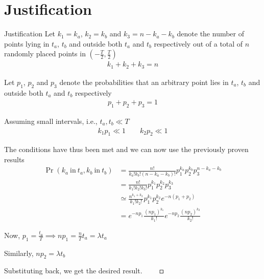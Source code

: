 \documentclass{beamer}
\providecommand{\pr}[1]{\ensuremath{\Pr\left(#1\right)}}
\providecommand{\brak}[1]{\ensuremath{\left(#1\right)}}
\begin{document}
	\section{Justification}
	\begin{frame}{Justification}
	Let $k_1 = k_a$, $k_2 = k_b$ and $k_3 = n - k_a - k_b$ denote the number of points lying in $t_a$, $t_b$ and outside both $t_a$ and $t_b$ respectively out of a total of $n$ randomly placed points in $\brak{-\frac{T}{2}, \frac{T}{2}}$
	\begin{align}
		k_1 + k_2 + k_3 = n
	\end{align}
	
	Let $p_1$, $p_2$ and $p_3$ denote the probabilities that an arbitrary point lies in $t_a$, $t_b$ and outside both $t_a$ and $t_b$ respectively
	\begin{align}
		p_1 + p_2 + p_3 = 1
	\end{align}
	
	Assuming small intervals, i.e., $t_a, t_b \ll T$
	\begin{align}
		k_1 p_1 \ll 1 \qquad k_2 p_2 \ll 1
	\end{align}
	\end{frame}		
	
	\begin{frame}
	The conditions have thus been met and we can now use the previously proven results
	\begin{align}
		\pr{k_a~\mathrm{in}~t_a, k_b~\mathrm{in}~t_b} &= \frac{n!}{k_a! k_b! (n-k_a-k_b)!} p_1^{k_a} p_2^{k_b} p_3^{n - k_a - k_b} \\
		&= \frac{n!}{k_1! k_2! k_3!} p_1^{k_1} p_2^{k_2} p_3^{k_3} \\
		&\simeq \frac{n^{k_1 + k_2}}{k_1! k_2!} p_1^{k_1} p_2^{k_2} e^{-n(p_1 + p_2)} \\
		&= e^{-np_1} \frac{(np_1)^{k_1}}{k_1!} e^{-np_2} \frac{(np_2)^{k_2}}{k_2!}
	\end{align}
	
	Now, $p_1 = \frac{t_a}{T} \implies np_1 = \frac{n}{T} t_a = \lambda t_a$
	
	Similarly, $np_2 = \lambda t_b$
	
	Substituting back, we get the desired result. $\qed$
	\end{frame}
	
\end{document}
